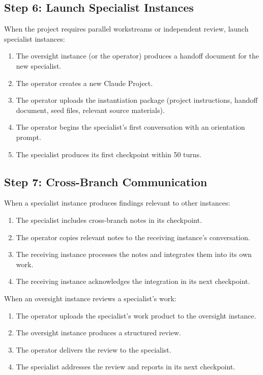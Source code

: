 \documentclass[11pt,a4paper]{article}
\begin{document}
\subsection{Step 6: Launch Specialist Instances}

When the project requires parallel workstreams or independent review, launch specialist instances:

\begin{enumerate}[leftmargin=2em]
    \item The oversight instance (or the operator) produces a handoff document for the new specialist.
    \item The operator creates a new Claude Project.
    \item The operator uploads the instantiation package (project instructions, handoff document, seed files, relevant source materials).
    \item The operator begins the specialist's first conversation with an orientation prompt.
    \item The specialist produces its first checkpoint within 50 turns.
\end{enumerate}

\subsection{Step 7: Cross-Branch Communication}

When a specialist instance produces findings relevant to other instances:

\begin{enumerate}[leftmargin=2em]
    \item The specialist includes cross-branch notes in its checkpoint.
    \item The operator copies relevant notes to the receiving instance's conversation.
    \item The receiving instance processes the notes and integrates them into its own work.
    \item The receiving instance acknowledges the integration in its next checkpoint.
\end{enumerate}

When an oversight instance reviews a specialist's work:

\begin{enumerate}[leftmargin=2em]
    \item The operator uploads the specialist's work product to the oversight instance.
    \item The oversight instance produces a structured review.
    \item The operator delivers the review to the specialist.
    \item The specialist addresses the review and reports in its next checkpoint.
\end{enumerate}
\end{document}
